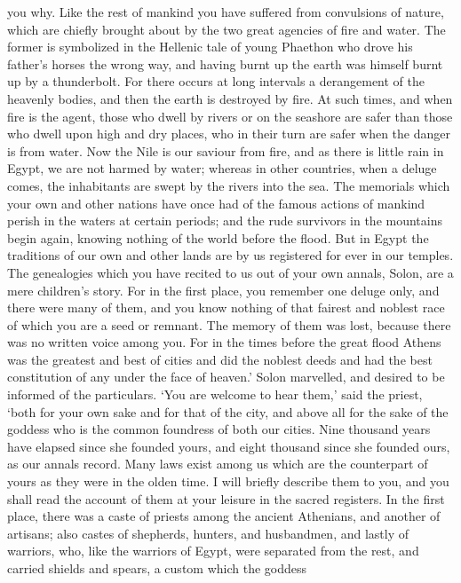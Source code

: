 you why. Like the rest of mankind you have suffered from convulsions of
nature, which are chiefly brought about by the two great agencies of fire
and water. The former is symbolized in the Hellenic tale of young Phaethon
who drove his father’s horses the wrong way, and having burnt up the earth
was himself burnt up by a thunderbolt. For there occurs at long intervals
a derangement of the heavenly bodies, and then the earth is destroyed by
fire. At such times, and when fire is the agent, those who dwell by rivers
or on the seashore are safer than those who dwell upon high and dry
places, who in their turn are safer when the danger is from water. Now the
Nile is our saviour from fire, and as there is little rain in Egypt, we
are not harmed by water; whereas in other countries, when a deluge comes,
the inhabitants are swept by the rivers into the sea. The memorials which
your own and other nations have once had of the famous actions of mankind
perish in the waters at certain periods; and the rude survivors in the
mountains begin again, knowing nothing of the world before the flood. But
in Egypt the traditions of our own and other lands are by us registered
for ever in our temples. The genealogies which you have recited to us out
of your own annals, Solon, are a mere children’s story. For in the first
place, you remember one deluge only, and there were many of them, and you
know nothing of that fairest and noblest race of which you are a seed or
remnant. The memory of them was lost, because there was no written voice
among you. For in the times before the great flood Athens was the greatest
and best of cities and did the noblest deeds and had the best constitution
of any under the face of heaven.’ Solon marvelled, and desired to be
informed of the particulars. ‘You are welcome to hear them,’ said the
priest, ‘both for your own sake and for that of the city, and above all
for the sake of the goddess who is the common foundress of both our
cities. Nine thousand years have elapsed since she founded yours, and
eight thousand since she founded ours, as our annals record. Many laws
exist among us which are the counterpart of yours as they were in the
olden time. I will briefly describe them to you, and you shall read the
account of them at your leisure in the sacred registers. In the first
place, there was a caste of priests among the ancient Athenians, and
another of artisans; also castes of shepherds, hunters, and husbandmen,
and lastly of warriors, who, like the warriors of Egypt, were separated
from the rest, and carried shields and spears, a custom which the goddess
